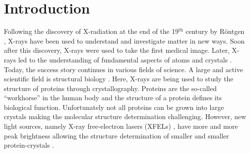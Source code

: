 \chapter{Introduction}
Following the discovery of X-radiation at the end of the 19$^{\text{th}}$ century by R\"ontgen \cite{Roentgen-NP}, X-rays have been used to understand and investigate matter in new ways. Soon after this discovery, X-rays were used to take the first medical image. Later, X-rays led to the understanding of fundamental aspects of atoms \citep{Siegbahn-NP} and crystals \citep{Laue-NP,Bragg-NP}. Today, the success story continues in various fields of science. A large and active scientific field is structural biology \cite{Karplus-NP,Kobilka-NP}. Here, X-rays are being used to study the structure of proteins through crystallography. Proteins are the so-called ``workhorse'' in the human body and the structure of a protein defines its biological function. Unfortunately not all proteins can be grown into large crystals making the molecular structure determination challenging. However, new light sources, namely X-ray free-electron lasers (XFELs) \citep{Ackermann-2007-NPho}, have more and more peak brightness allowing the structure determination of smaller and smaller protein-crystals \citep{Chapman-2011-Nature}.\\[1\baselineskip]
